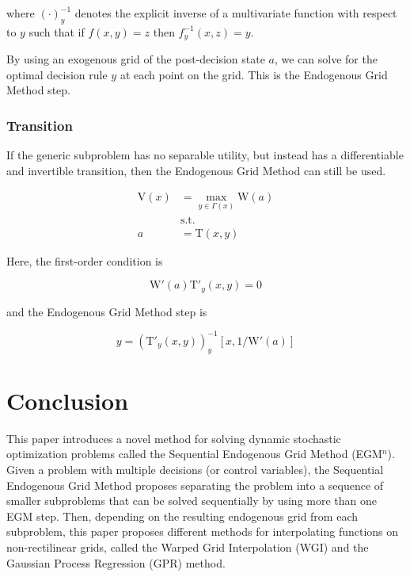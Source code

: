 \documentclass{article}
\newcommand{\VFunc}{\mathrm{V}}
\newcommand{\PGro}{\Gamma}
\newcommand{\aRat}{a}
\newcommand{\xRat}{x}
\newcommand{\TFunc}{\mathrm{T}}
\newcommand{\WFunc}{\mathrm{W}}
\newcommand{\yRat}{y}
\begin{document}
where $\left( \cdot \right)^{ -1}_{\yRat}$ denotes the explicit inverse of a multivariate function with respect to $\yRat$ such that if $f(x,y) = z$ then $f^{ -1}_{y}(x,z) = y$.

By using an exogenous grid of the post-decision state $\aRat$, we can solve for the optimal decision rule $\yRat$ at each point on the grid. This is the Endogenous Grid Method step.

\subsubsection{Transition}\label{Transition}

If the generic subproblem has no separable utility, but instead has a differentiable and invertible transition, then the Endogenous Grid Method can still be used.

\begin{equation}
\begin{split}
        \VFunc(\xRat) &  = \max_{\yRat  \in \PGro(\xRat)}  \WFunc(\aRat) \\
        & \text{s.t.} \\
        \aRat & = \TFunc(\xRat,\yRat)
    \end{split}
\end{equation}

Here, the first-order condition is

\begin{equation}
\WFunc'(\aRat)\TFunc'_{\yRat}(\xRat,\yRat)  = 0
\end{equation}

and the Endogenous Grid Method step is

\begin{equation}
\yRat = \left(\TFunc'_{\yRat}(\xRat,\yRat)\right)^{-1}_{\yRat} \left[ \xRat, 1 / \WFunc'(\aRat)\right]
\end{equation}

\section{Conclusion}\label{conclusion}


This paper introduces a novel method for solving dynamic stochastic optimization problems called the Sequential Endogenous Grid Method (EGM$^n$). Given a problem with multiple decisions (or control variables), the Sequential Endogenous Grid Method proposes separating the problem into a sequence of smaller subproblems that can be solved sequentially by using more than one EGM step. Then, depending on the resulting endogenous grid from each subproblem, this paper proposes different methods for interpolating functions on non-rectilinear grids, called the Warped Grid Interpolation (WGI) and the Gaussian Process Regression (GPR) method.
\end{document}
